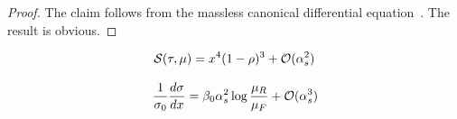 \begin{proof}
The claim follows from the massless canonical differential
equation~\cite{TPC:1088-MONOPOLE-Multi-Scale-Ordered-Next-to-Leading-Open-Source-Power-Suppressed-Optimal-Latent-Estimators-September-24-2026}.
The result is obvious.
\end{proof}

\begin{equation}
  \mathcal{S}(\tau, \mu) = {x}^{4} (1 - \rho)^{3} + \mathcal{O}(\alpha_s^{2})
  \label{eq:2}
\end{equation}

\begin{equation}
  \frac{1}{\sigma_0} \frac{d\sigma}{dx} = \beta_0 \alpha_s^2 \log\frac{\mu_R}{\mu_F} + \mathcal{O}(\alpha_s^{3})
  \label{eq:3}
\end{equation}

